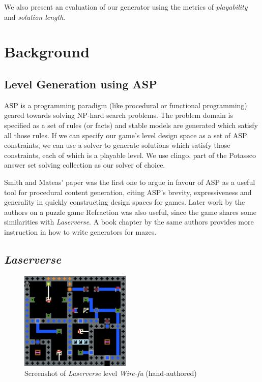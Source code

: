 \documentclass[letterpaper]{article}
\begin{document}
We also present an evaluation of our generator using the metrics of \textit{playability} and \textit{solution length}.

\section{Background}

\subsection{Level Generation using ASP}
ASP is a programming paradigm (like procedural or functional programming) geared towards solving NP-hard search
problems. The problem domain is specified as a set of rules (or facts) and stable models are generated which satisfy all
those rules. If we can specify our game's level design space as a set of ASP constraints, we can use a solver to
generate solutions which satisfy those constraints, each of which is a playable level. We use clingo, part of the
Potassco answer set solving collection \cite{gebser2011potassco} as our solver of choice.

Smith and Mateas' paper \cite{smith2011answer} was the first one to argue in favour of ASP as a useful tool for
procedural content generation, citing ASP's brevity, expressiveness and generality in quickly constructing design spaces
for games. Later work by the authors on a puzzle game Refraction \cite{smith2012case} was also useful, since the game
shares some similarities with \textit{Laserverse}. A book chapter by the same authors \cite{nelson2016asp} provides more
instruction in how to write generators for mazes.

\subsection{\textit{Laserverse}}

\begin{figure}
    \centering
    \includegraphics[width=0.47\textwidth]{wirefu.png}
    \caption{Screenshot of \textit{Laserverse} level \textit{Wire-fu} (hand-authored)}
    \label{fig:wirefu}
\end{figure}
\end{document}
